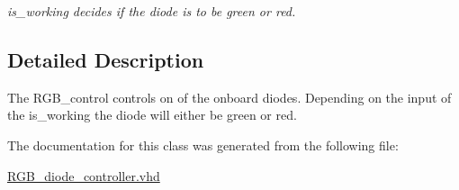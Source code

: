\begin{DoxyCompactItemize}
\begin{DoxyCompactList}\small\item\em is\-\_\-working decides if the diode is to be green or red. \end{DoxyCompactList}\end{DoxyCompactItemize}


\subsection{Detailed Description}
The R\-G\-B\-\_\-control controls on of the onboard diodes. Depending on the input of the is\-\_\-working the diode will either be green or red. 

The documentation for this class was generated from the following file\-:\begin{DoxyCompactItemize}
\item 
\hyperlink{RGB__diode__controller_8vhd}{R\-G\-B\-\_\-diode\-\_\-controller.\-vhd}\end{DoxyCompactItemize}
